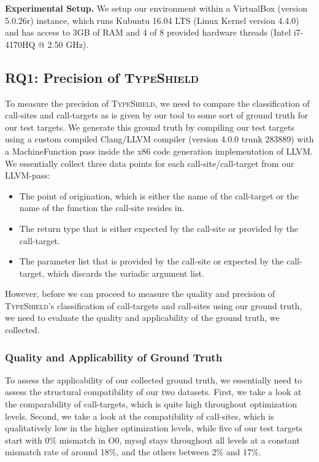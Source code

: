 \textbf{Experimental Setup.} We setup our environment within a VirtualBox (version 5.0.26r) instance, which runs Kubuntu 16.04 LTS (Linux Kernel
version 4.4.0) and has access to 3GB of RAM and 4 of 8 provided hardware threads (Intel i7-4170HQ @ 2.50 GHz).

\subsection{RQ1: Precision of \textsc{TypeShield}}
\label{section:typeshieldprecision}

To measure the precision of \textsc{TypeShield}, we need to compare the classification of call-sites and call-targets as is given by our tool to
some sort of ground truth for our test targets. We generate this ground truth by compiling our test targets using a custom compiled Clang/LLVM
compiler (version 4.0.0 trunk 283889) with a MachineFunction pass inside the x86 code generation implementation of LLVM. We essentially 
collect three data points for each call-site/call-target from our LLVM-pass:
\begin{itemize}
\item The point of origination, which is either the name of the call-target or the name of the function the call-site resides in.
\item The return type that is either expected by the call-site or provided by the call-target.
\item The parameter list that is provided by the call-site or expected by the call-target, which discards the variadic argument list.
\end{itemize}
However, before we can proceed to measure the quality and precision of \textsc{TypeShield}'s classification of call-targets and call-sites
using our ground truth, we need to evaluate the quality and applicability of the ground truth, we collected.

\subsubsection{Quality and Applicability of Ground Truth}
\label{subsection:typeshieldprecision}
To assess the applicability of our collected ground truth, we essentially need to assess the structural compatibility of our two datasets.
First, we take a look at the comparability of call-targets, which is quite high throughout optimization levels. 
Second, we take a look at the compatibility of call-sites, which is qualitatively low in the higher optimization levels, while 
five of our test targets start with 0\% mismatch in O0, mysql stays throughout all levels at a constant mismatch 
rate of around 18\%, and the others between 2\% and 17\%.

